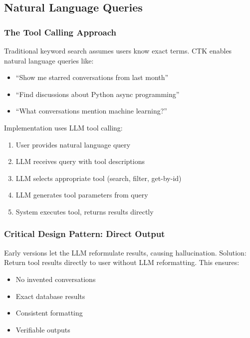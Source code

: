 \documentclass[11pt,letterpaper]{article}
\begin{document}
\subsection{Natural Language Queries}

\subsubsection{The Tool Calling Approach}

Traditional keyword search assumes users know exact terms. CTK enables natural language queries like:

\begin{itemize}
    \item ``Show me starred conversations from last month''
    \item ``Find discussions about Python async programming''
    \item ``What conversations mention machine learning?''
\end{itemize}

Implementation uses LLM tool calling:
\begin{enumerate}
    \item User provides natural language query
    \item LLM receives query with tool descriptions
    \item LLM selects appropriate tool (search, filter, get-by-id)
    \item LLM generates tool parameters from query
    \item System executes tool, returns results directly
\end{enumerate}

\subsubsection{Critical Design Pattern: Direct Output}

Early versions let the LLM reformulate results, causing hallucination. Solution: Return tool results directly to user without LLM reformatting. This ensures:

\begin{itemize}
    \item No invented conversations
    \item Exact database results
    \item Consistent formatting
    \item Verifiable outputs
\end{itemize}
\end{document}
